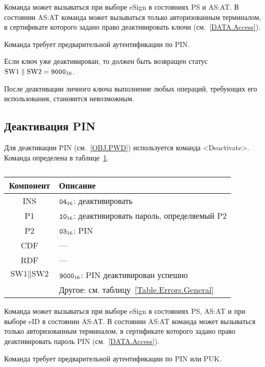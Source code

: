Команда может вызываться при выборе eSign в состояниях 
PS и AS:AT. В состоянии AS:AT команда может вызываться 
только авторизованным терминалом, в сертификате которого задано право
деактивировать ключи (см.~\ref{DATA.Access}).

Команда требует предварительной аутентификации по PIN. 

Если ключ уже деактивирован, то должен быть возвращен статус
$\text{SW1} \parallel \text{SW2} = \texttt{9000}_{16}$.

После деактивации личного ключа выполнение любых операций, 
требующих его использования, становится невозможным.

\subsection{Деактивация PIN}
\label{Oper.Descr.DeactivatePIN} 

Для деактивации PIN (см.~\ref{OBJ.PWD}) используется команда <Deactivate>.
Команда определена в таблице~\ref{Table.Oper.DeactivatePINCmd}.

\begin{table}[hbt]
\caption{}\label{Table.Oper.DeactivatePINCmd}
\begin{tabular}{|c|p{14cm}|}
\hline
Компонент & Описание \\
\hline
\hline
INS & $\texttt{04}_{16}$: деактивировать \\
\hline
P1 & $\texttt{10}_{16}$: деактивировать пароль, определяемый P2\\
\hline
P2 & $\texttt{03}_{16}$: PIN \\
\hline
CDF &  --- \\
\hline 
RDF & --- \\
\hline
$\text{SW1} \parallel \text{SW2}$ & 
$\texttt{9000}_{16}$: PIN деактивирован успешно\\
\cline{2-2}
  & Другое: см. таблицу~\ref{Table.Errors.General}\\
\hline
\end{tabular}
\end{table}

Команда может вызываться при выборе eSign в состояниях 
PS, AS:AT и при выборе eID в состоянии AS:AT. 
В состоянии AS:AT команда может вызываться только авторизованным терминалом, 
в сертификате которого задано право деактивировать пароль PIN
(см.~\ref{DATA.Access}).

Команда требует предварительной аутентификации по PIN или PUK. 

